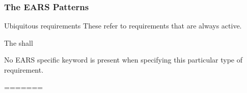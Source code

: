 \documentclass[aspectratio=169]{beamer}
\begin{document}
\begin{frame}[fragile]
  \frametitle{The EARS Patterns}
  \begin{block}{Ubiquitous requirements}
    These refer to requirements that are always active. 
    \begin{center}
    The {\color{red}{$<$system name$>$}} shall {\color{blue}{$<$system response$>$}}
    \end{center}
    No EARS specific keyword is present when specifying this particular type of requirement.
  \end{block}
=======


    



\end{frame}
\end{document}
